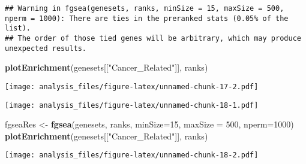 \documentclass[]{article}
\newenvironment{Shaded}{\begin{snugshade}}{\end{snugshade}}
\newcommand{\DataTypeTok}[1]{\textcolor[rgb]{0.13,0.29,0.53}{#1}}
\newcommand{\DecValTok}[1]{\textcolor[rgb]{0.00,0.00,0.81}{#1}}
\newcommand{\KeywordTok}[1]{\textcolor[rgb]{0.13,0.29,0.53}{\textbf{#1}}}
\newcommand{\NormalTok}[1]{#1}
\newcommand{\OperatorTok}[1]{\textcolor[rgb]{0.81,0.36,0.00}{\textbf{#1}}}
\newcommand{\StringTok}[1]{\textcolor[rgb]{0.31,0.60,0.02}{#1}}
\begin{document}
\begin{verbatim}
## Warning in fgsea(genesets, ranks, minSize = 15, maxSize = 500, nperm = 1000): There are ties in the preranked stats (0.05% of the list).
## The order of those tied genes will be arbitrary, which may produce unexpected results.
\end{verbatim}

\begin{Shaded}
\begin{Highlighting}[]
\KeywordTok{plotEnrichment}\NormalTok{(genesets[[}\StringTok{"Cancer_Related"}\NormalTok{]], ranks)}
\end{Highlighting}
\end{Shaded}

\texttt{[image: analysis\_files/figure-latex/unnamed-chunk-17-2.pdf]}

\begin{Shaded}
\end{Shaded}

\texttt{[image: analysis\_files/figure-latex/unnamed-chunk-18-1.pdf]}

\begin{Shaded}
\begin{Highlighting}[]
\NormalTok{fgseaRes <-}\StringTok{ }\KeywordTok{fgsea}\NormalTok{(genesets, ranks, }\DataTypeTok{minSize=}\DecValTok{15}\NormalTok{, }\DataTypeTok{maxSize =} \DecValTok{500}\NormalTok{, }\DataTypeTok{nperm=}\DecValTok{1000}\NormalTok{)}
\KeywordTok{plotEnrichment}\NormalTok{(genesets[[}\StringTok{"Cancer_Related"}\NormalTok{]], ranks)}
\end{Highlighting}
\end{Shaded}

\texttt{[image: analysis\_files/figure-latex/unnamed-chunk-18-2.pdf]}
\end{document}
